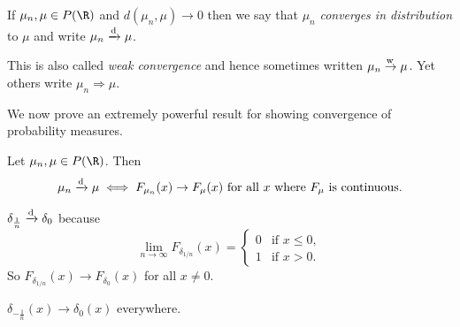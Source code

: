
\begin{definition} \label{def:dto}
    If $\mu_n, \mu \in P(\R)$ and $d(\mu_n, \mu) \to 0$ then we say that
    $\mu_n$ \emph{converges in distribution} to $\mu$ and write
    $\mu_n \xrightarrow{\text{d}} \mu$.
\end{definition}
\begin{remark}
    This is also called \emph{weak convergence} and hence sometimes written
    $\mu_n \overset{\text{w\,}}{\rightarrow} \mu$.
    Yet others write $\mu_n \Rightarrow \mu$.
\end{remark}

We now prove an extremely powerful result for showing convergence of
probability measures.
\begin{proposition*} \label{thm:dto:cont}
    Let $\mu_n, \mu \in P(\R)$.
    Then \[
        \mu_n \xrightarrow{\text{d}} \mu \iff F_{\mu_n}(x) \to F_\mu(x) \text{ for all } x
        \text{ where } F_\mu \text{ is continuous.}
    \]
\end{proposition*}
\begin{examples}
    \item $\delta_{\frac1n} \xrightarrow{\text{d}} \delta_0$ because \[
        \lim_{n \to \infty} F_{\delta_{1/n}}(x) = \begin{cases}
            0 & \text{if } x \le 0, \\
            1 & \text{if } x > 0.
        \end{cases}
    \] So $F_{\delta_{1/n}}(x) \to F_{\delta_0}(x)$ for all $x \ne 0$.
    \item $\delta_{-\frac1n}(x) \to \delta_0(x)$ everywhere.
\end{examples}

